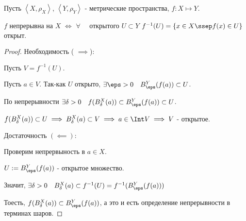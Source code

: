 \begin{theorem} \label{cont:preimage_of_open}\thmslashn

    Пусть $\left<X, \rho_{X}\right>$, $\left<Y, \rho_{Y}\right>$ - метрические пространства, $f : X \mapsto Y$.

    $f$ непрерывна на $X$ $\iff$ $\forall{}\quad $ открытого $U \subset Y$ $f^{-1}(U) = \{x\in X \ssep f(x)\in U\} $ открыт.
    \begin{proof} \thmslashn
    
        Необходимость ( $\implies$):

        Пусть $V = f^{-1}(U)$.

        Пусть $a\in V$. Так-как $U$ открыто, $\exists{\eps > 0}\quad B^{Y}_{\eps}(f(a)) \subset U$.

        По непрерывности $\exists{\delta > 0}\quad f(B^{X}_{\delta}(a)) \subset B^{Y}_{\eps}(f(a)) \subset U$.

        $f(B^{X}_{\delta}(a)) \subset U \implies B^{X}_{\delta}(a) \subset V \implies a\in \Int V \implies V$ - открытое.

        Достаточность $(\impliedby)$:

        Проверим непрервыность в $a\in X$.

        $U := B^{Y}_{\eps}(f(a))$ - открытое множество.

        Значит, $\exists{\delta > 0}\quad B^{X}_{\delta}(a) \subset f^{-1}(U) = f^{-1}(B^{Y}_{\eps}(f(a)))$
        
        Тоесть, $f(B^{X}_{\delta}(a)) \subset B^{Y}_{\eps}(f(a))$, а это и есть определение непрерывности в терминах шаров.
    \end{proof}
\end{theorem}
